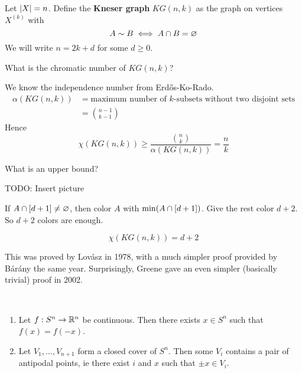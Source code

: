 \documentclass{article}
\begin{document}
\newlec

Let $\left\lvert X\right\rvert = n$. Define the {\bf Kneser graph} $KG(n, k)$ as the graph on vertices $X^{(k)}$ with
$$A \sim B \iff A \cap B = \varnothing$$
We will write $n = 2k + d$ for some $d \ge 0$.

\begin{question}
  What is the chromatic number of $KG(n, k)$?
\end{question}

We know the independence number from Erd\H os-Ko-Rado.
\begin{align*}
  \alpha(KG(n, k))
  & = \text{maximum number of $k$-subsets without two disjoint sets} \\
  & = \binom{n - 1}{k - 1}
\end{align*}
Hence
$$\chi(KG(n, k)) \ge \frac{\binom nk}{\alpha(KG(n, k))} = \frac nk$$

What is an upper bound?

TODO: Insert picture

If $A \cap [d + 1] \ne \varnothing$, then color $A$ with $\min(A \cap [d + 1])$. Give the rest color $d + 2$. So $d + 2$ colors are enough.

\begin{conjecture}[Kneser]
  $$\chi(KG(n, k)) = d + 2$$
\end{conjecture}

This was proved by Lov\'asz in 1978, with a much simpler proof provided by B\'ar\'any the same year. Surprisingly, Greene gave an even simpler (basically trivial) proof in 2002.

\begin{nthm}\label{thm:borsuk}~
  \begin{enumerate}
    \item Let $f : S^n \to \mathbb R^n$ be continuous. Then there exists $x \in S^n$ such that $f(x) = f(-x)$.
    \item Let $V_1, \dots, V_{n + 1}$ form a closed cover of $S^n$. Then some $V_i$ contains a pair of antipodal points, ie there exist $i$ and $x$ such that $\pm x \in V_i$.
  \end{enumerate}
\end{nthm}
\end{document}
